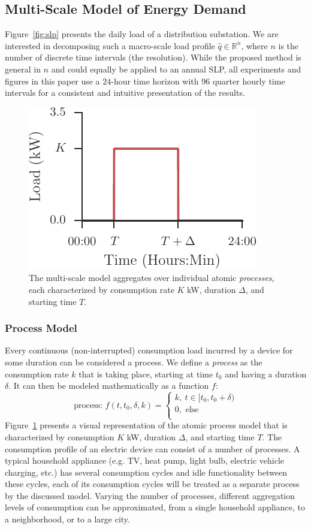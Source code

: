 \documentclass[conference]{IEEEtran}
\begin{document}
\subsection{Multi-Scale Model of Energy Demand}\label{sec:LoadProfilesDecomposition}

Figure~\ref{fig:slp} presents the daily load of a distribution substation. We are interested in decomposing such a macro-scale load profile $\hat{q} \in \mathbb{R}^n$, where $n$ is the number of discrete time intervals (the resolution). While the proposed method is general in $n$ and could equally be applied to an annual SLP, all experiments and figures in this paper use a $24$-hour time horizon with 96 quarter hourly time intervals for a consistent and intuitive presentation of the results.

\begin{figure}[!b]
\centering
\includegraphics[width=0.5\columnwidth]{figures/process.pdf}
\caption{The multi-scale model aggregates over individual atomic \emph{processes}, each characterized by consumption rate $K$ kW, duration $\Delta$, and starting time $T$.}
\label{fig:process}
\end{figure}

\subsubsection{Process Model}
Every continuous (non-interrupted) consumption load incurred by a device for some duration can be considered a process.  We define a \emph{process} as the consumption rate $k$ that is taking place, starting at time $t_0$ and having a duration $\delta$. It can then be modeled mathematically as a function $f$:
\begin{equation}
\text{process: }f(t, t_0, \delta, k) =
\left\lbrace
\begin{array}{l}
 k,~t \in [t_0, t_0+\delta)\\
 0, \text{ else}\\
\end{array}
\right.
\end{equation}
Figure~\ref{fig:process} presents a visual representation of the atomic process model that is characterized by consumption $K$ kW, duration $\Delta$, and starting time $T$. The consumption profile of an electric device can consist of a number of processes. A typical household appliance (e.g. TV, heat pump, light bulb, electric vehicle charging, etc.) has several consumption cycles and idle functionality between these cycles, each of its consumption cycles will be treated as a separate process by the discussed model. Varying the number of processes, different aggregation levels of consumption can be approximated, from a single household appliance, to a neighborhood, or to a large city.
\end{document}
